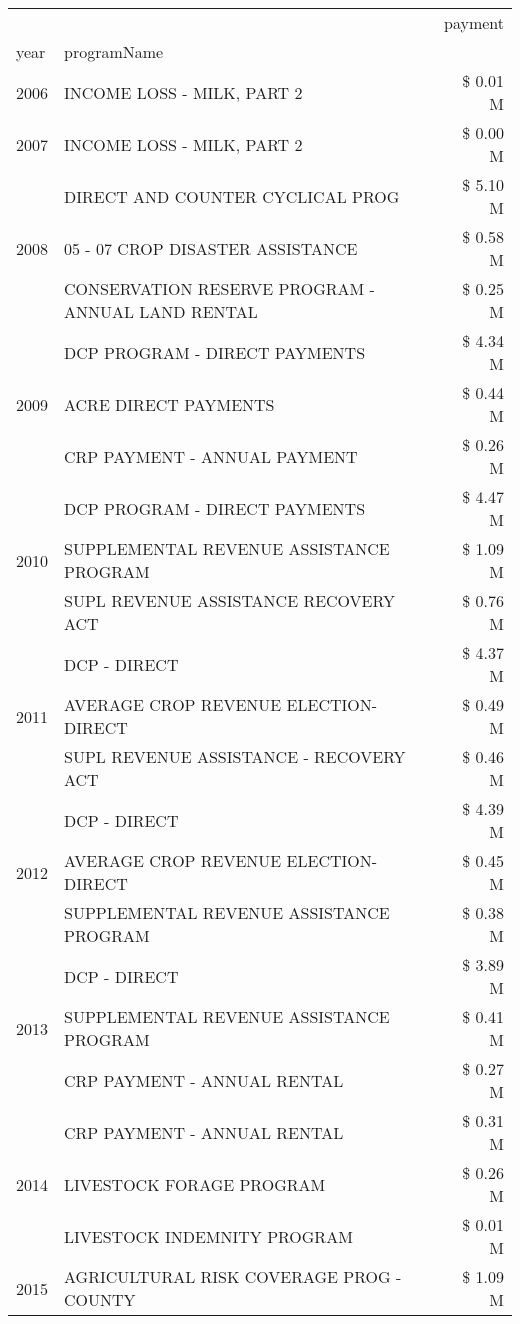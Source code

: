 \begin{tabular}{llr}
\toprule
 &  & payment \\
year & programName &  \\
\midrule
2006 & INCOME LOSS - MILK, PART 2 & \$ 0.01 M \\
\cline{1-3}
2007 & INCOME LOSS - MILK, PART 2 & \$ 0.00 M \\
\cline{1-3}
\multirow[t]{3}{*}{2008} & DIRECT AND COUNTER CYCLICAL PROG & \$ 5.10 M \\
 & 05 - 07 CROP DISASTER ASSISTANCE & \$ 0.58 M \\
 & CONSERVATION RESERVE PROGRAM - ANNUAL LAND RENTAL & \$ 0.25 M \\
\cline{1-3}
\multirow[t]{3}{*}{2009} & DCP PROGRAM - DIRECT PAYMENTS & \$ 4.34 M \\
 & ACRE DIRECT PAYMENTS & \$ 0.44 M \\
 & CRP PAYMENT - ANNUAL PAYMENT & \$ 0.26 M \\
\cline{1-3}
\multirow[t]{3}{*}{2010} & DCP PROGRAM - DIRECT PAYMENTS & \$ 4.47 M \\
 & SUPPLEMENTAL REVENUE ASSISTANCE PROGRAM & \$ 1.09 M \\
 & SUPL REVENUE ASSISTANCE RECOVERY ACT & \$ 0.76 M \\
\cline{1-3}
\multirow[t]{3}{*}{2011} & DCP - DIRECT & \$ 4.37 M \\
 & AVERAGE CROP REVENUE ELECTION-DIRECT & \$ 0.49 M \\
 & SUPL REVENUE ASSISTANCE - RECOVERY ACT & \$ 0.46 M \\
\cline{1-3}
\multirow[t]{3}{*}{2012} & DCP - DIRECT & \$ 4.39 M \\
 & AVERAGE CROP REVENUE ELECTION-DIRECT & \$ 0.45 M \\
 & SUPPLEMENTAL REVENUE ASSISTANCE PROGRAM & \$ 0.38 M \\
\cline{1-3}
\multirow[t]{3}{*}{2013} & DCP - DIRECT & \$ 3.89 M \\
 & SUPPLEMENTAL REVENUE ASSISTANCE PROGRAM & \$ 0.41 M \\
 & CRP PAYMENT - ANNUAL RENTAL & \$ 0.27 M \\
\cline{1-3}
\multirow[t]{3}{*}{2014} & CRP PAYMENT - ANNUAL RENTAL & \$ 0.31 M \\
 & LIVESTOCK FORAGE PROGRAM & \$ 0.26 M \\
 & LIVESTOCK INDEMNITY PROGRAM & \$ 0.01 M \\
\cline{1-3}
\multirow[t]{3}{*}{2015} & AGRICULTURAL RISK COVERAGE PROG - COUNTY & \$ 1.09 M \\

\end{tabular}
